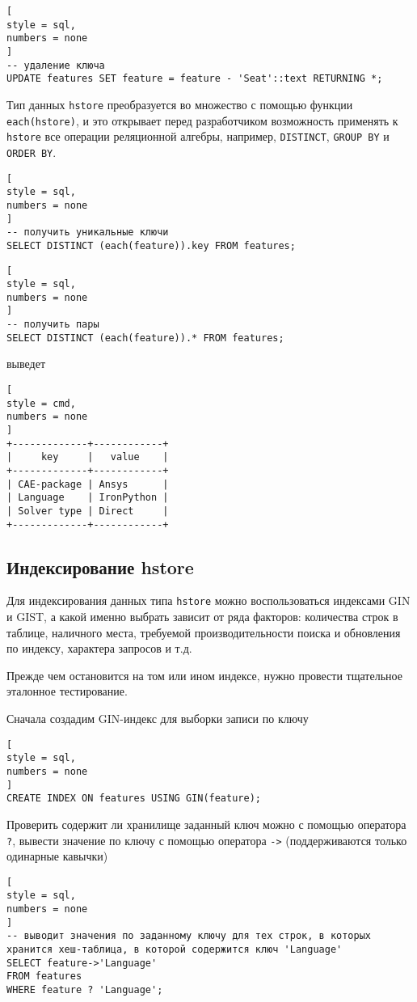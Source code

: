 \documentclass[%
	11pt,
	a4paper,
	utf8,
		]{article}
\begin{document}
\begin{lstlisting}[
style = sql,
numbers = none
]
-- удаление ключа
UPDATE features SET feature = feature - 'Seat'::text RETURNING *;
\end{lstlisting}

Тип данных \texttt{hstore} преобразуется во множество с помощью функции \texttt{each(hstore)}, и это открывает перед разработчиком возможность применять к \texttt{hstore} все операции реляционной алгебры, например, \texttt{DISTINCT}, \texttt{GROUP BY} и \texttt{ORDER BY}.

\begin{lstlisting}[
style = sql,
numbers = none
]
-- получить уникальные ключи
SELECT DISTINCT (each(feature)).key FROM features;
\end{lstlisting}

\begin{lstlisting}[
style = sql,
numbers = none
]
-- получить пары
SELECT DISTINCT (each(feature)).* FROM features;
\end{lstlisting}
выведет
\begin{lstlisting}[
style = cmd,
numbers = none
]
+-------------+------------+
|     key     |   value    |
+-------------+------------+
| CAE-package | Ansys      |
| Language    | IronPython |
| Solver type | Direct     |
+-------------+------------+
\end{lstlisting}

\subsection{Индексирование hstore}

Для индексирования данных типа \texttt{hstore} можно воспользоваться индексами GIN и GIST, а какой именно выбрать зависит от ряда факторов: количества строк в таблице, наличного места, требуемой производительности поиска и обновления по индексу, характера запросов и т.д. 

Прежде чем остановится на том или ином индексе, нужно провести тщательное эталонное тестирование.

Сначала создадим GIN-индекс для выборки записи по ключу
\begin{lstlisting}[
style = sql,
numbers = none
]
CREATE INDEX ON features USING GIN(feature);
\end{lstlisting}

Проверить содержит ли хранилище заданный ключ можно с помощью оператора \verb|?|, вывести значение по ключу с помощью оператора \verb|->| (поддерживаются только одинарные кавычки)
\begin{lstlisting}[
style = sql,
numbers = none
]
-- выводит значения по заданному ключу для тех строк, в которых хранится хеш-таблица, в которой содержится ключ 'Language'
SELECT feature->'Language'
FROM features
WHERE feature ? 'Language';
\end{lstlisting}
\end{document}

